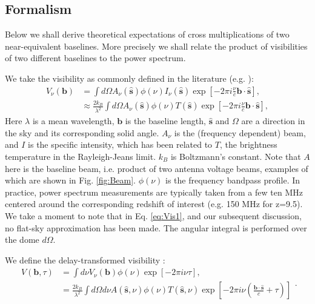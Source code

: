 \documentclass[twocolumn,apj,numberedappendix]{emulateapj}
\renewcommand\[{\begin{equation}}
\renewcommand\]{\end{equation}}
\begin{document}
\subsection{Formalism}
Below we shall derive theoretical expectations of cross multiplications
of two near-equivalent baselines. More precisely we shall relate
the product of visibilities of two different baselines to the power spectrum. 


We take the visibility as commonly defined in the literature (e.g.
\citealt{first-paper}): 
\begin{equation}
\begin{aligned}V_{\nu}(\boldsymbol{b}) & =\int d\Omega A_{\nu}(\hat{\boldsymbol{s}})\phi(\nu)I_{\nu}(\hat{\boldsymbol{s}})\exp\left[-2\pi i\frac{\nu}{c}\boldsymbol{b}\cdot\hat{\boldsymbol{s}}\right],\\
 & \approx\frac{2k_{B}}{\lambda^{2}}\int d\Omega A_{\nu}(\hat{\boldsymbol{s}})\phi(\nu)T(\hat{\boldsymbol{s}})\exp\left[-2\pi i\frac{\nu}{c}\boldsymbol{b}\cdot\hat{\boldsymbol{s}}\right],
\end{aligned}
\label{eq:Vis1}
\end{equation}
Here $\lambda$ is a mean wavelength, $\boldsymbol{b}$ is the baseline
length, $\hat{\boldsymbol{s}}$ and $\Omega$ are a direction in the
sky and its corresponding solid angle. $A_{\nu}$ is the (frequency
dependent) beam, and $I$ is the specific intensity, which has been
related to $T$, the brightness temperature in the Rayleigh-Jeans
limit. $k_B$ is Boltzmann's constant. Note that $A$ here is the baseline beam, i.e. product of two antenna voltage beams, examples of which are shown in Fig. \ref{fig:Beam}. $\phi(\nu)$ is the frequency bandpass profile. In practice,
power spectrum measurements are typically taken from a few ten MHz centered around the corresponding redshift of interest (e.g. 150 MHz for z=9.5). We take a moment to note that in Eq. \ref{eq:Vis1}, and our subsequent discussion, no flat-sky approximation has been made. The angular integral is performed over the dome $d\Omega$. 

We define the delay-transformed visibility \citep{delay-transform}:
\small
\begin{equation}
\begin{aligned}V(\boldsymbol{b},\tau) & =\int d\nu V_{\nu}(\boldsymbol{b})\phi(\nu)\exp\left[-2\pi i\nu\tau\right],\\
 & =\frac{2k_{B}}{\lambda^{2}}\int d\Omega d\nu A(\hat{\boldsymbol{s}},\nu)\phi(\nu)T(\hat{\boldsymbol{s}},\nu)\exp\left[-2\pi i\nu\left(\frac{\boldsymbol{b}\cdot\hat{\boldsymbol{s}}}{c}+\tau\right)\right]
\end{aligned}
.\label{eq:Vb1}
\end{equation}
\normalsize
\end{document}

